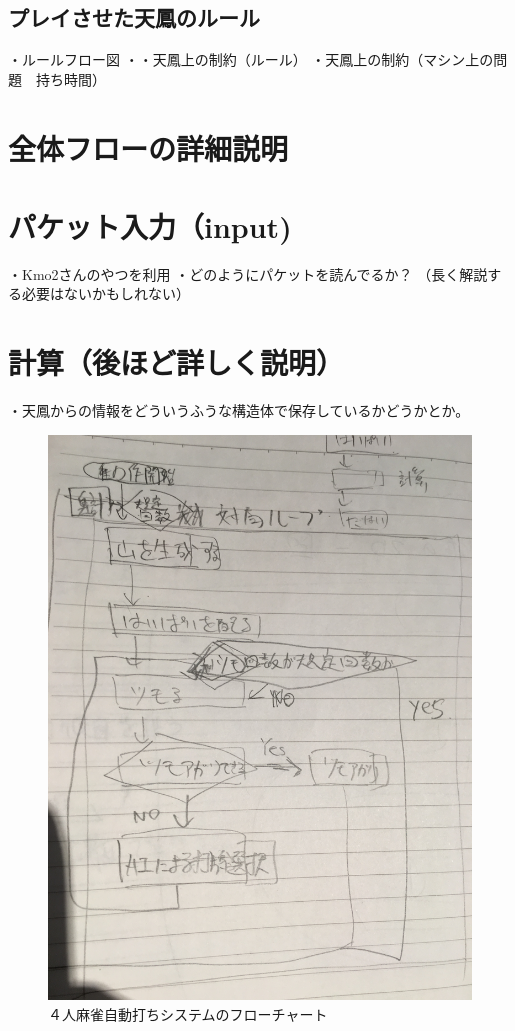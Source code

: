 \subsection{プレイさせた天鳳のルール}
・ルールフロー図
・・天鳳上の制約（ルール）
・天鳳上の制約（マシン上の問題　持ち時間）

\section{全体フローの詳細説明}

\section{パケット入力（input)}
・Kmo2さんのやつを利用
・どのようにパケットを読んでるか？
（長く解説する必要はないかもしれない）

\section{計算（後ほど詳しく説明）}
・天鳳からの情報をどういうふうな構造体で保存しているかどうかとか。

\begin{figure}[h]
 \centering
 \includegraphics[keepaspectratio, scale=0.1,bb=0 0 3024 4032]
      {img/flow.jpg}
 \caption{４人麻雀自動打ちシステムのフローチャート}
\end{figure}

